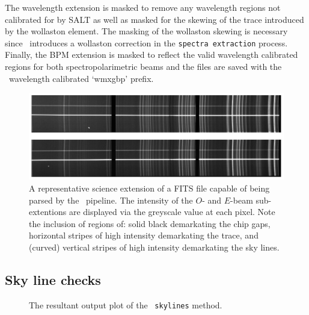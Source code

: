 The wavelength extension is masked to remove any wavelength regions not calibrated for by \gls{SALT} as well as masked for the skewing of the trace introduced by the wollaston element. The masking of the wollaston skewing is necessary since \polsalt\ introduces a wollaston correction in the \texttt{spectra extraction} process. Finally, the \gls{BPM} extension is masked to reflect the valid wavelength calibrated regions for both spectropolarimetric beams and the files are saved with the \polsalt\ wavelength calibrated `wmxgbp' prefix.

\begin{figure}[t]
    \centering
    \includegraphics[width = 1.0\textwidth]{figures/3_post_wav_cal.pdf}
    \caption{A representative science extension of a \gls{FITS} file capable of being parsed by the \polsalt\ pipeline. The intensity of the $O$- and $E$-beam sub-extentions are displayed via the greyscale value at each pixel. Note the inclusion of regions of: solid black demarkating the chip gaps, horizontal stripes of high intensity demarkating the trace, and (curved) vertical stripes of high intensity demarkating the sky lines.}
    \label{fig:polsalt_post_wav_cal}
\end{figure}

\subsection{Sky line checks}\label{subsec:stops_skyline}



\begin{figure}[t]
    \centering
    \caption{The resultant output plot of the \stops\ \texttt{skylines} method.}
    \label{fig:stops_sky_eg}
\end{figure}


